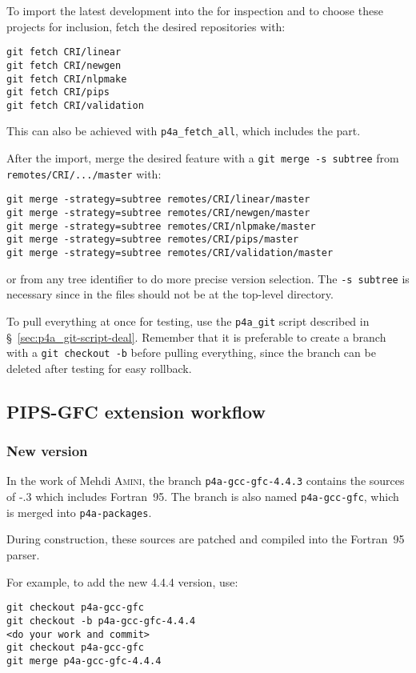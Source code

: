\documentclass[a4paper]{article}
\begin{document}
To import the latest \Apips development into the \Apfa{} \Agit for
inspection and to choose these projects for inclusion, fetch the
desired repositories with:
\begin{verbatim}
git fetch CRI/linear
git fetch CRI/newgen
git fetch CRI/nlpmake
git fetch CRI/pips
git fetch CRI/validation
\end{verbatim}
This can also be achieved with \verb|p4a_fetch_all|, which includes the
\Apolylib part.

After the import, merge the desired feature with a \texttt{git merge -s
  subtree} from \texttt{remotes/CRI/.../master} with:
\begin{verbatim}
git merge -strategy=subtree remotes/CRI/linear/master
git merge -strategy=subtree remotes/CRI/newgen/master
git merge -strategy=subtree remotes/CRI/nlpmake/master
git merge -strategy=subtree remotes/CRI/pips/master
git merge -strategy=subtree remotes/CRI/validation/master
\end{verbatim}
or from any tree identifier to do more precise version selection. The
\texttt{-s subtree} is necessary since in \Apfa the \Apips files
should not be
at the top-level directory.

To pull everything at once for testing, use the
\verb|p4a_git| script described in
\S~\ref{sec:p4a_git-script-deal}. Remember that
it is preferable to create a branch with a \texttt{git checkout
  -b} before pulling everything, since the branch can be deleted after
testing for easy rollback.


\subsection{PIPS-GFC extension workflow}
\label{sec:pips-gfc-workflow}


\subsubsection{New version}
\label{sec:new-version}

In the work of Mehdi \textsc{Amini}, the branch
\texttt{p4a-gcc-gfc-4.4.3} contains the sources of \Agcc-.3
which includes Fortran~95. The branch is also named \texttt{p4a-gcc-gfc},
which is merged into \texttt{p4a-packages}.

During \Apfa construction, these sources are patched and compiled into the
\Apips Fortran~95 parser.

For example, to add the new 4.4.4 version, use:
\begin{verbatim}
git checkout p4a-gcc-gfc
git checkout -b p4a-gcc-gfc-4.4.4
<do your work and commit>
git checkout p4a-gcc-gfc
git merge p4a-gcc-gfc-4.4.4
\end{verbatim}
\end{document}
